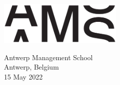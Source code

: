 \begin{titlepage}
\begin{center}
		\vspace{0.8cm}
	
			\includegraphics[width=6cm]{images/ams-logo}
		
		\vspace{0.8cm}
		
		\Large
		Antwerp Management School\\
		Antwerp, Belgium\\
		15 May 2022
	\end{center}
\end{titlepage}